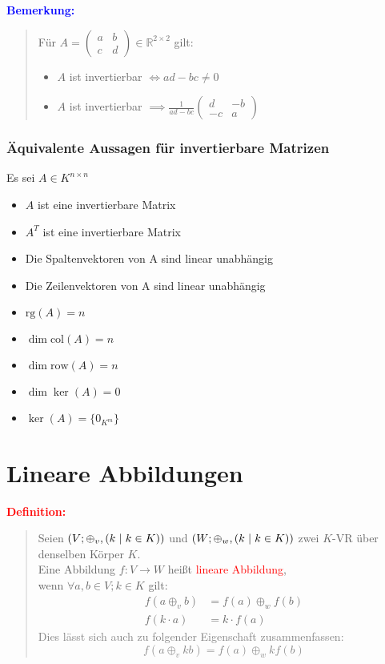 \documentclass{article}
\newcommand{\smsp}{\phantom{\hspace{3px}}}
\newcommand{\red}[1]{\textcolor{red}{#1}}
\newcommand{\gray}[1]{\textcolor{gray}{#1}}
\newcommand{\blue}[1]{\textcolor{blue}{#1}}
\newcommand{\de}[1]{\red{\textbf{Definition: }}\begin{quote}#1\end{quote}}
\newcommand{\an}[1]{\blue{\textbf{Bemerkung: }}\begin{quote}#1\end{quote}}
\newcommand{\R}{\mathbb{R}}
\renewcommand{\st}{\smsp | \smsp}
\newcommand{\col}{\text{col}}
\newcommand{\row}{\text{row}}
\newcommand{\rg}{\text{rg}}
\begin{document}
\an{
    Für $A = \begin{pmatrix}
        a & b\\
        c & d
    \end{pmatrix} \in \R^{2 \times 2}$ gilt:
    \begin{itemize}
        \item $A$ ist invertierbar $\iff ad - bc \neq 0$
        \item $A$ ist invertierbar $\implies \frac{1}{ad - bc} \begin{pmatrix}
            d & -b\\
            -c & a
        \end{pmatrix}$
    \end{itemize}
}

\subsubsection{Äquivalente Aussagen für invertierbare Matrizen}

Es sei $A \in K^{n \times n}$
\begin{itemize}
    \item $A$ ist eine invertierbare Matrix
    \item $A^T$ ist eine invertierbare Matrix
    \item Die Spaltenvektoren von A sind linear unabhängig
    \item Die Zeilenvektoren von A sind linear unabhängig
    \item $\rg(A) = n$
    \item $\dim \col(A) = n$
    \item $\dim \row(A) = n$
    \item $\dim \ker(A) = 0$
    \item $\ker(A) = \{0_{K^m}\}$
\end{itemize}

\newpage
\section{Lineare Abbildungen}

\de{
    Seien $(V; \oplus_v, (k \st k \in K))$ und $(W; \oplus_w, (k \st k \in K))$ zwei $K$-VR über denselben Körper $K$.\\
    Eine Abbildung $f: V \to W$ heißt \red{lineare Abbildung},\\
    wenn $\forall a,b \in V; k \in K$ gilt:
    \begin{align*}
        f(a \oplus_v b) &= f(a) \oplus_w f(b)\\
        f(k \cdot a) &= k \cdot f(a)
    \end{align*}
    \gray{
        Dies lässt sich auch zu folgender Eigenschaft zusammenfassen:
        $$
            f(a \oplus_v kb) = f(a) \oplus_w kf(b)
        $$
    }
}
\end{document}
